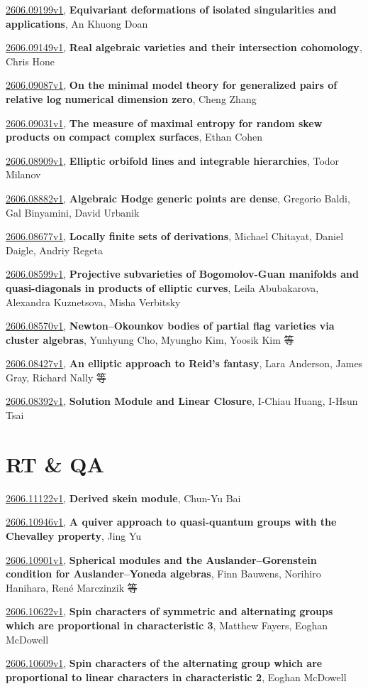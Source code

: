 \documentclass[9pt, a4paper]{article}
\theoremstyle{plain}
\theoremstyle{definition}
\theoremstyle{remark}
\newcommand{\arxiv}[3]{\href{https://arxiv.org/abs/#1}{#1}, \textbf{\textcolor{arxivblue}{#2}}, #3}
\begin{document}
\arxiv{2606.09199v1}{Equivariant deformations of isolated singularities and applications}{An Khuong Doan}

\arxiv{2606.09149v1}{Real algebraic varieties and their intersection cohomology}{Chris Hone}

\arxiv{2606.09087v1}{On the minimal model theory for generalized pairs of relative log numerical dimension zero}{Cheng Zhang}

\arxiv{2606.09031v1}{The measure of maximal entropy for random skew products on compact complex surfaces}{Ethan Cohen}

\arxiv{2606.08909v1}{Elliptic orbifold lines and integrable hierarchies}{Todor Milanov}

\arxiv{2606.08882v1}{Algebraic Hodge generic points are dense}{Gregorio Baldi, Gal Binyamini, David Urbanik}

\arxiv{2606.08677v1}{Locally finite sets of derivations}{Michael Chitayat, Daniel Daigle, Andriy Regeta}

\arxiv{2606.08599v1}{Projective subvarieties of Bogomolov-Guan manifolds and quasi-diagonals in products of elliptic curves}{Leila Abubakarova, Alexandra Kuznetsova, Misha Verbitsky}

\arxiv{2606.08570v1}{Newton--Okounkov bodies of partial flag varieties via cluster algebras}{Yunhyung Cho, Myungho Kim, Yoosik Kim 等}

\arxiv{2606.08427v1}{An elliptic approach to Reid's fantasy}{Lara Anderson, James Gray, Richard Nally 等}

\arxiv{2606.08392v1}{Solution Module and Linear Closure}{I-Chiau Huang, I-Hsun Tsai}


\section{RT \& QA}
\arxiv{2606.11122v1}{Derived skein module}{Chun-Yu Bai}

\arxiv{2606.10946v1}{A quiver approach to quasi-quantum groups with the Chevalley property}{Jing Yu}

\arxiv{2606.10901v1}{Spherical modules and the Auslander--Gorenstein condition for Auslander--Yoneda algebras}{Finn Bauwens, Norihiro Hanihara, René Marczinzik 等}

\arxiv{2606.10622v1}{Spin characters of symmetric and alternating groups which are proportional in characteristic 3}{Matthew Fayers, Eoghan McDowell}

\arxiv{2606.10609v1}{Spin characters of the alternating group which are proportional to linear characters in characteristic 2}{Eoghan McDowell}
\end{document}
